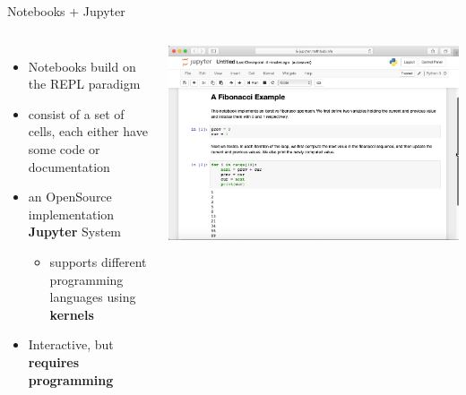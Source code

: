 \documentclass{beamer}
\begin{document}
    \begin{frame}{Notebooks + Jupyter}
        \begin{columns}
            \begin{itemize}
                \item Notebooks build on the REPL paradigm
                \item consist of a set of cells, each either have some code or documentation
                \item an OpenSource implementation \textbf{Jupyter} System
                \begin{itemize}
                    \item supports different programming languages using \textbf{kernels}
                \end{itemize}
                \item Interactive, but \textbf{requires programming}
            \end{itemize}
            \includegraphics[scale=0.2]{images/notebook}
        \end{columns}
    \end{frame}
\end{document}
